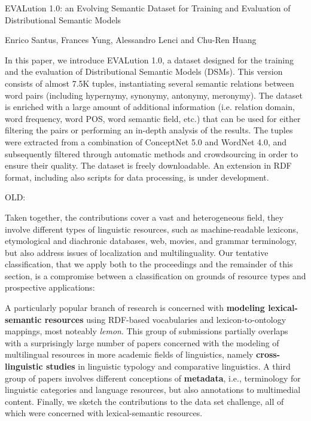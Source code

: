 
	  EVALution 1.0: an Evolving Semantic Dataset for Training and Evaluation of
							Distributional Semantic Models

			Enrico Santus, Frances Yung, Alessandro Lenci and Chu-Ren Huang

		In this paper, we introduce EVALution 1.0, a dataset designed for the
		training and the evaluation of Distributional Semantic Models (DSMs). This
		version consists of almost 7.5K tuples, instantiating several semantic
		relations between word pairs (including hypernymy, synonymy, antonymy,
		meronymy). The dataset is enriched with a large amount of additional
		information (i.e. relation domain, word frequency, word POS, word semantic
		field, etc.) that can be used for either filtering the pairs or performing
		an in-depth analysis of the results. The tuples were extracted from a
		combination of ConceptNet 5.0 and WordNet 4.0, and subsequently filtered
		through automatic methods and crowdsourcing in order to ensure their
		quality. The dataset is freely downloadable. An extension in RDF format,
		including also scripts for data processing, is under development.




 





OLD:


Taken together, the contributions cover a vast and heterogeneous field, they involve different types of linguistic resources, such as machine-readable lexicons, etymological and diachronic databases, web, movies, and grammar terminology, but also address issues of localization and multilinguality. Our tentative classification, that we apply both to the proceedings and the remainder of this section, is a compromise between a classification on grounds of resource types and prospective applications:

A particularly popular branch of research is concerned with \textbf{modeling lexical-semantic resources} using RDF-based vocabularies and lexicon-to-ontology mappings, most noteably \emph{lemon}. 
This group of submissions partially overlaps with a surprisingly large number of papers concerned with the modeling of multilingual resources in more academic fields of linguistics, namely \textbf{cross-linguistic studies} in linguistic typology and comparative linguistics.
A third group of papers involves different conceptions of \textbf{metadata}, i.e., terminology for linguistic categories and language resources, but also annotations to multimedial content.
Finally, we sketch the contributions to the data set challenge, all of which were concerned with lexical-semantic resources.

